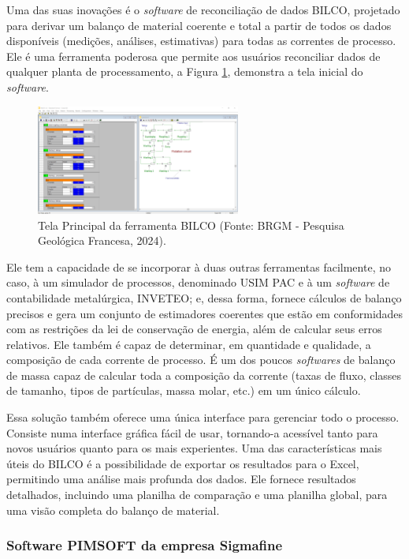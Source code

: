Uma das suas inovações é o \textit{software} de reconciliação de dados BILCO, projetado para derivar um balanço de material coerente e total a partir de todos os dados disponíveis (medições, análises, estimativas) para todas as correntes de processo. Ele é uma ferramenta poderosa que permite aos usuários reconciliar dados de qualquer planta de processamento, a Figura \ref{fig:BILCO}, demonstra a tela inicial do \textit{software}.

\begin{figure}[htbp!] 
    \centering
    \includegraphics[width=0.6\textwidth]{figuras/BILCOCASPEOP.png}
    \caption{Tela Principal da ferramenta BILCO (Fonte: BRGM - Pesquisa Geológica Francesa, 2024).}
    \label{fig:BILCO}
\end{figure}

Ele tem a capacidade de se incorporar à duas outras ferramentas facilmente, no caso, à um simulador de processos, denominado USIM PAC e à um \textit{software} de contabilidade metalúrgica, INVETEO; e, dessa forma, fornece cálculos de balanço precisos e gera um conjunto de estimadores coerentes que estão em conformidades com as restrições da lei de conservação de energia, além de calcular seus erros relativos. Ele também é capaz de determinar, em quantidade e qualidade, a composição de cada corrente de processo. É um dos poucos \textit{softwares} de balanço de massa capaz de calcular toda a composição da corrente (taxas de fluxo, classes de tamanho, tipos de partículas, massa molar, etc.) em um único cálculo.

Essa solução também oferece uma única interface para gerenciar todo o processo. Consiste numa interface gráfica fácil de usar, tornando-a acessível tanto para novos usuários quanto para os mais experientes. Uma das características mais úteis do BILCO é a possibilidade de exportar os resultados para o Excel, permitindo uma análise mais profunda dos dados. Ele fornece resultados detalhados, incluindo uma planilha de comparação e uma planilha global, para uma visão completa do balanço de material.

\subsubsection{Software PIMSOFT da empresa Sigmafine}


